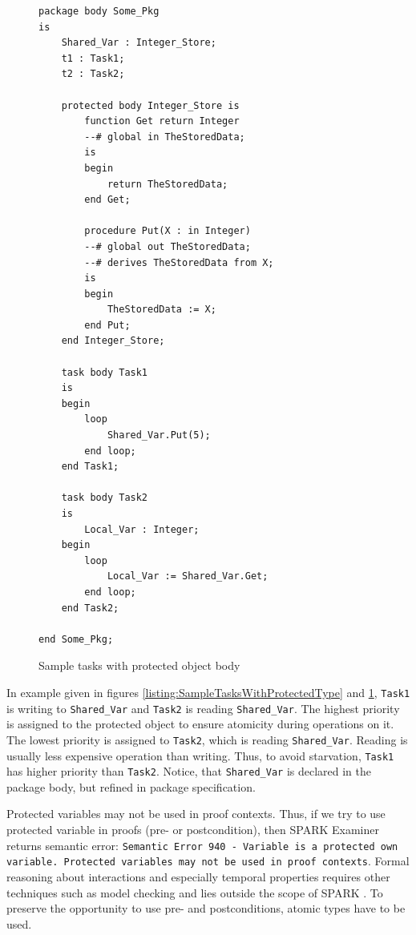 \begin{figure}
\singlespacing
\begin{lstlisting}[frame=single, gobble=0]
package body Some_Pkg
is
    Shared_Var : Integer_Store;
    t1 : Task1;
    t2 : Task2;

    protected body Integer_Store is
        function Get return Integer
        --# global in TheStoredData;
        is
        begin
            return TheStoredData;
        end Get;

        procedure Put(X : in Integer)
        --# global out TheStoredData;
        --# derives TheStoredData from X;
        is
        begin
            TheStoredData := X;
        end Put;
    end Integer_Store;

    task body Task1
    is
    begin
        loop
            Shared_Var.Put(5);
        end loop;
    end Task1;

    task body Task2
    is
        Local_Var : Integer;
    begin
        loop
            Local_Var := Shared_Var.Get;
        end loop;
    end Task2;

end Some_Pkg;
\end{lstlisting} 
\doublespacing
\caption{Sample tasks with protected object body}
\label{listing:SampleTasksWithProtectedTypeBody}
\end{figure}

In example given in figures \ref{listing:SampleTasksWithProtectedType} and \ref{listing:SampleTasksWithProtectedTypeBody}, \lstinline{Task1} is writing to \lstinline{Shared_Var} and \lstinline{Task2} is reading \lstinline{Shared_Var}. The highest priority is assigned to the protected object to ensure atomicity during operations on it. The lowest priority is assigned to \lstinline{Task2}, which is reading \lstinline{Shared_Var}. Reading is usually less expensive operation than writing. Thus, to avoid starvation, \lstinline{Task1} has higher priority than \lstinline{Task2}. Notice, that \lstinline{Shared_Var} is declared in the package body, but refined in package specification.

Protected variables may not be used in proof contexts. Thus, if we try to use protected variable in proofs (pre- or postcondition), then SPARK Examiner returns semantic error: \lstinline{Semantic Error 940 - Variable is a protected own variable. Protected variables may not be used in proof contexts}. Formal reasoning about interactions and especially temporal properties requires other techniques such as model checking and lies outside the scope of SPARK \cite{Barnes:Book}. To preserve the opportunity to use pre- and postconditions, atomic types have to be used.

